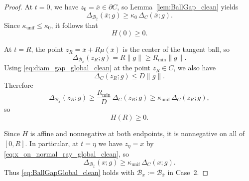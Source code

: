 \documentclass{article}
\begin{document}
\begin{proof}
At $t=0$, we have $z_0=\bar x\in\partial C$, so Lemma~\ref{lem:BallGap_clean} yields
\[
\Delta_{\mathcal B_{\bar x}}(\bar x;g)\ge \kappa_0\,\Delta_C(\bar x;g).
\]
Since $\kappa_{\mathrm{unif}}\le \kappa_0$, it follows that
\begin{equation}
H(0)\ge 0.
\label{eq:H0_nonneg_global_clean}
\end{equation}

At $t=R$, the point $z_R=\bar x+R\mu(\bar x)$ is the center of the tangent ball, so
\[
\Delta_{\mathcal B_{\bar x}}(z_R;g)=R\|g\|\ge R_{\min}\|g\|.
\]
Using \eqref{eq:diam_gap_global_clean} at the point $z_R\in C$, we also have
\[
\Delta_C(z_R;g)\le D\|g\|.
\]
Therefore
\[
\Delta_{\mathcal B_{\bar x}}(z_R;g)\ge \frac{R_{\min}}{D}\,\Delta_C(z_R;g)\ge \kappa_{\mathrm{unif}}\,\Delta_C(z_R;g),
\]
so
\begin{equation}
H(R)\ge 0.
\label{eq:HR_nonneg_global_clean}
\end{equation}

Since $H$ is affine and nonnegative at both endpoints, it is nonnegative on all of $[0,R]$.
In particular, at $t=\eta$ we have $z_\eta=x$ by \eqref{eq:x_on_normal_ray_global_clean}, so
\[
\Delta_{\mathcal B_{\bar x}}(x;g)\ge \kappa_{\mathrm{unif}}\,\Delta_C(x;g).
\]
Thus \eqref{eq:BallGapGlobal_clean} holds with $\mathcal B_x:=\mathcal B_{\bar x}$ in Case~2.
\end{proof}
\end{document}
